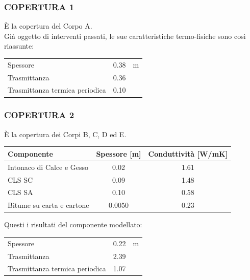\subsubsection{COPERTURA 1}
È la copertura del Corpo A.\\Già oggetto di interventi passati, le sue caratteristiche termo-fisiche sono così riassunte:
\begin{center}
	\begin{tabular}{lcc}
		\toprule
		Spessore & \num{0.38} & \si{m}\\
		Trasmittanza & \num{0.36} & \trasm\\
		Trasmittanza termica periodica & \num{0.10} & \trasm\\
		\bottomrule
	\end{tabular}
\end{center}
\subsubsection{COPERTURA 2}
È la copertura dei Corpi B, C, D ed E.
\begin{center}
	\begin{tabular}{lcc}
		\toprule
		Componente & Spessore [m] & Conduttività [\si{W/mK}] \\
		\midrule
		Intonaco di Calce e Gesso & \num{0.02} & \num{1.61} \\
		CLS SC  & \num{0.09} & \num{1.48}\\
		CLS SA & \num{0.10} & \num{0.58} \\
		Bitume su carta e cartone & \num{0.0050} & \num{0.23} \\
		\bottomrule
	\end{tabular}
\end{center}
Questi i risultati del componente modellato:
\begin{center}
	\begin{tabular}{lcc}
		\toprule
		Spessore & \num{0.22} & \si{m}\\
		Trasmittanza & \num{2.39} & \trasm\\
		Trasmittanza termica periodica & \num{1.07} & \trasm\\
		\bottomrule
	\end{tabular}
\end{center}
